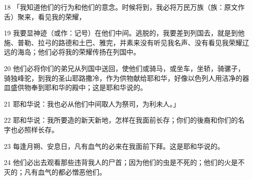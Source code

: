 \par 18 「我知道他们的行为和他们的意念。时候将到，我必将万民万族（族：原文作舌）聚来，看见我的荣耀，
\par 19 我要显神迹（或作：记号）在他们中间。逃脱的，我要差到列国去，就是到他施、普勒、拉弓的路德和土巴、雅完，并素来没有听见我名声、没有看见我荣耀辽远的海岛；他们必将我的荣耀传扬在列国中。
\par 20 他们必将你们的弟兄从列国中送回，使他们或骑马，或坐车，坐轿，骑骡子，骑独峰驼，到我的圣山耶路撒冷，作为供物献给耶和华，好像以色列人用洁净的器皿盛供物奉到耶和华的殿中；这是耶和华说的。
\par 21 耶和华说：我也必从他们中间取人为祭司，为利未人。」
\par 22 耶和华说：我所要造的新天新地，怎样在我面前长存；你们的後裔和你们的名字也必照样长存。
\par 23 每逢月朔、安息日，凡有血气的必来在我面前下拜。这是耶和华说的。
\par 24 他们必出去观看那些违背我人的尸首；因为他们的虫是不死的；他们的火是不灭的；凡有血气的都必憎恶他们。


